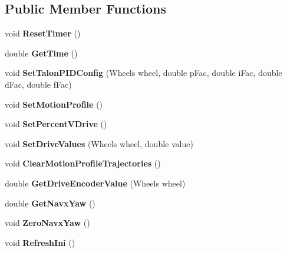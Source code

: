 \subsection*{Public Member Functions}
\begin{DoxyCompactItemize}
\item 
\mbox{\label{class_robot_model_a12fcf976a7f338c4d7dcba8b2765bbca}} 
void {\bfseries Reset\+Timer} ()
\item 
\mbox{\label{class_robot_model_a53211a6f086c2934f29696097e33c13c}} 
double {\bfseries Get\+Time} ()
\item 
\mbox{\label{class_robot_model_a5c46e71b1ecd43497fa6a552edee2850}} 
void {\bfseries Set\+Talon\+P\+I\+D\+Config} (Wheels wheel, double p\+Fac, double i\+Fac, double d\+Fac, double f\+Fac)
\item 
\mbox{\label{class_robot_model_a9e82ace9c9249288fd82b58a6ec1288e}} 
void {\bfseries Set\+Motion\+Profile} ()
\item 
\mbox{\label{class_robot_model_a00aec98c4ed4de1e7f48c2482fdad2a1}} 
void {\bfseries Set\+Percent\+V\+Drive} ()
\item 
\mbox{\label{class_robot_model_a98f996b588768ca75ca0cf2dddcd217c}} 
void {\bfseries Set\+Drive\+Values} (Wheels wheel, double value)
\item 
\mbox{\label{class_robot_model_ac34a7071a6f8e1cccc5b16acd966d512}} 
void {\bfseries Clear\+Motion\+Profile\+Trajectories} ()
\item 
\mbox{\label{class_robot_model_a79245b48351252c90a9ff994e9b40ebb}} 
double {\bfseries Get\+Drive\+Encoder\+Value} (Wheels wheel)
\item 
\mbox{\label{class_robot_model_a48702daa83b141eb0dd1dc6f0fd75c35}} 
double {\bfseries Get\+Navx\+Yaw} ()
\item 
\mbox{\label{class_robot_model_a49cf4f33221954e0efbfc14dae477595}} 
void {\bfseries Zero\+Navx\+Yaw} ()
\item 
\mbox{\label{class_robot_model_a3f5ac4f1f526f4610573fc3dbcdc722c}} 
void {\bfseries Refresh\+Ini} ()
\end{DoxyCompactItemize}
